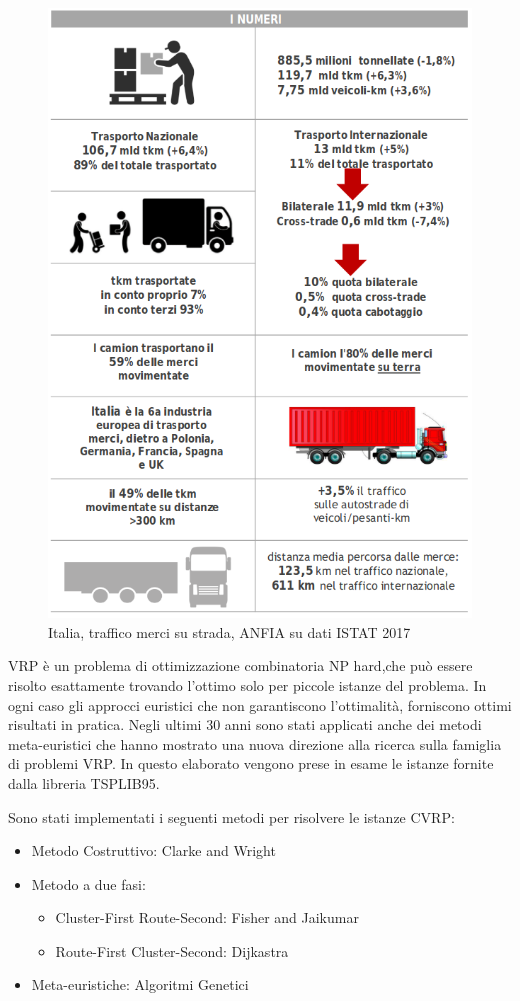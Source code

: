 \documentclass[]{article}
\begin{document}
\begin{figure}[h!]
	\centering
	\includegraphics[scale=0.50]{images/ITA28.png}
	\caption{ Italia, traffico merci su strada, ANFIA su dati ISTAT 2017 }
	\label{fig:ITA28}
\end{figure}

VRP è un problema di ottimizzazione combinatoria NP hard,che può essere risolto esattamente trovando l'ottimo solo per piccole istanze del problema. In ogni caso gli approcci euristici che non garantiscono l'ottimalità, forniscono ottimi risultati in pratica.
Negli ultimi 30 anni sono stati applicati anche dei metodi meta-euristici che hanno mostrato una nuova direzione alla ricerca sulla famiglia di problemi VRP.
In questo elaborato vengono prese in esame le istanze fornite dalla libreria TSPLIB95\cite{TSPLIB95}.

Sono stati implementati i seguenti metodi per risolvere le istanze CVRP:
\begin{itemize}
	\item Metodo Costruttivo: Clarke and Wright
	\item Metodo a due fasi:
	\begin{itemize}
		\item Cluster-First Route-Second: Fisher and Jaikumar
		\item Route-First Cluster-Second: Dijkastra
	\end{itemize}
	\item Meta-euristiche: Algoritmi Genetici
\end{itemize}
\end{document}
